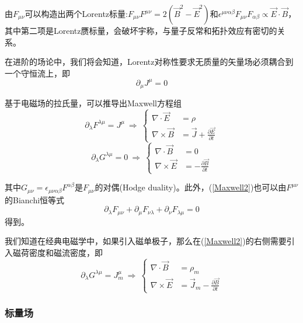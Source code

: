 由$F_{\mu\nu}$可以构造出两个Lorentz标量:$F_{\mu\nu}F^{\mu\nu}=2(\vec{B}^2-\vec{E}^2)$和$\epsilon^{\mu\nu\alpha\beta}F_{\mu\nu}F_{\alpha\beta}\propto\vec{E}\cdot\vec{B}$，其中第二项是Lorentz赝标量，会破坏宇称，与量子反常和拓扑效应有密切的关系。

在进阶的场论中，我们将会知道，Lorentz对称性要求无质量的矢量场必须耦合到一个守恒流上，即
\begin{equation}
    \partial_\mu J^\mu=0
\end{equation}

基于电磁场的拉氏量，可以推导出Maxwell方程组
\begin{equation}\label{Maxwell1}
    \partial_\lambda F^{\lambda\mu}=J^\mu
    \ \Rightarrow\ \left\{
        \begin{split}
            \nabla\cdot\vec{E}&=\rho \\
            \nabla\times\vec{B}&=\vec{J}+\frac{\partial\vec{E}}{\partial t}
        \end{split}
        \right. 
\end{equation}
\begin{equation}\label{Maxwell2}
    \partial_\lambda G^{\lambda\mu}=0
    \ \Rightarrow\ \left\{
        \begin{split}
            \nabla\cdot\vec{B}&=0 \\
            \nabla\times\vec{E}&=-\frac{\partial\vec{B}}{\partial t}
        \end{split}
    \right.
\end{equation}

其中$G_{\mu\nu}=\epsilon_{\mu\nu\alpha\beta}F^{\alpha\beta}$是$F_{\mu\nu}$的对偶(Hodge duality)。此外，(\ref{Maxwell2})也可以由$F^{\mu\nu}$的Bianchi恒等式$$\partial_\lambda F_{\mu\nu}+\partial_\mu F_{\nu\lambda}+\partial_\nu F_{\lambda\mu}=0$$得到。

我们知道在经典电磁学中，如果引入磁单极子，那么在(\ref{Maxwell2})的右侧需要引入磁荷密度和磁流密度，即
\begin{equation}
    \partial_\lambda G^{\lambda\mu}=J_m^\mu
    \ \Rightarrow\ \left\{
        \begin{split}
            \nabla\cdot\vec{B}&=\rho_m \\
            \nabla\times\vec{E}&=\vec{J}_m-\frac{\partial\vec{B}}{\partial t}
        \end{split}
    \right.
\end{equation}

\subsubsection{标量场}

